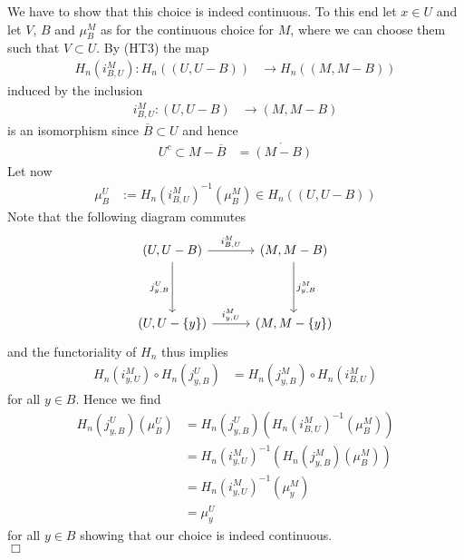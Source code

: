 \begin{prf}
We have to show that this choice is indeed continuous. To this end let $x \in U$ and let $V$, $B$ and $\mu_{B}^{M}$ as for the continuous choice for $M$, where we can choose them such that $V \subset U$. By (HT3) the map
\begin{align*}
  H_{n}(i_{B,U}^{M})
  \colon
  H_{n}((U,U - B))
  &\to
  H_{n}((M,M - B))
\end{align*}
induced by the inclusion
\begin{align*}
  i_{B,U}^{M}
  \colon
  (U,U - B)
  &\to
  (M,M - B)
\end{align*}
is an isomorphism since $\overline{B} \subset U$ and hence
\begin{align*}
  U^{c}
  \subset
  M
  -
  \overline{B}
  &=
  \mathring{(M - B)}
\end{align*}
Let now
\begin{align*}
  \mu_{B}^{U}
  &:=
  H_{n}(i_{B,U}^{M})^{-1}
  \left(
    \mu_{B}^{M}
  \right)
  \in
  H_{n}((U,U - B))
\end{align*}
Note that the following diagram commutes
\begin{equation*}
\begin{tikzcd}[row sep=4em,column sep=3em]
  (U,U - B)
  \ar{r}{i_{B,U}^{M}}
  \ar{d}[swap]{j_{y,B}^{U}}
  &
  (M,M - B)
  \ar{d}{j_{y,B}^{M}}
  \\
  (U,U - \lbrace y \rbrace)
  \ar{r}{i_{y,U}^{M}}
  &
  (M,M - \lbrace y \rbrace)
\end{tikzcd}
\end{equation*}
and the functoriality of $H_{n}$ thus implies
\begin{align}
\label{inclcomm}
  H_{n}(i_{y,U}^{M})
  \circ
  H_{n}(j_{y,B}^{U})
  &=
  H_{n}(j_{y,B}^{M})
  \circ
  H_{n}(i_{B,U}^{M})
\end{align}
for all $y \in B$. Hence we find
\begin{align*}
  H_{n}(j_{y,B}^{U})(\mu_{B}^{U})
  &=
  H_{n}(j_{y,B}^{U})
  \left(
    H_{n}(i_{B,U}^{M})^{-1}(\mu_{B}^{M})
  \right)
  \\
  &=
  H_{n}(i_{y,U}^{M})^{-1}
  \left(
    H_{n}(j_{y,B}^{M})(\mu_{B}^{M})
  \right)
  \\
  &=
  H_{n}(i_{y,U}^{M})^{-1}(\mu_{y}^{M})
  \\
  &=
  \mu_{y}^{U}
\end{align*}
for all $y \in B$ showing that our choice is indeed continuous.
\\
\phantom{proven}
\hfill
$\Box$
\end{prf}
